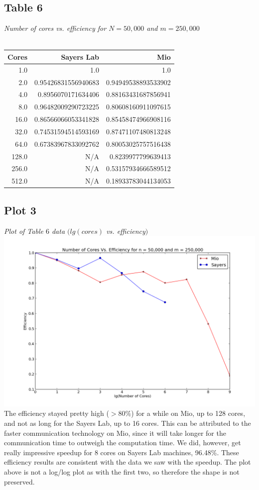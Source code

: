 \documentclass[letterpaper, 12pt]{article}
\begin{document}
	\subsection*{Table 6} \small\textit{Number of cores vs. efficiency for $N=50,000$ and $m=250,000$} \\\\
	\normalsize
	\begin{tabular}{r||r|r}
	\hline
		Cores              &Sayers Lab                     &Mio \\ 
	\hline
		  1.0                     &1.0                     &1.0 \\ 
		  2.0     &0.95426831556940683     &0.94949538893533902 \\ 
		  4.0      &0.8956070171634406     &0.88163431687856941 \\ 
		  8.0     &0.96482009290723225     &0.80608160911097615 \\ 
		 16.0     &0.86566066053341828     &0.85458474966908116 \\ 
		 32.0     &0.74531594514593169     &0.87471107480813248 \\ 
		 64.0     &0.67383967833092762     &0.80053025757516438 \\ 
		128.0                     &N/A      &0.8239977799639413 \\ 
		256.0                     &N/A     &0.53157934666589512 \\ 
		512.0                     &N/A     &0.18933783044134053 \\ 
		\hline
	\end{tabular}
	
	\subsection*{Plot 3} \small\textit{Plot of Table $6$ data $(lg(cores)$ vs. efficiency$)$} \\
	\normalsize
	\includegraphics[width=.75\linewidth]{ProjectFiles/results/plots/coresVefficiency.png} \\
	The efficiency stayed pretty high ($>80\%$) for a while on Mio, up to 128 cores, and not as long for the Sayers Lab, up to 16 cores. This can be attributed to the faster communication technology on Mio, since it will take longer for the communication time to outweigh the computation time. We did, however, get really impressive speedup for 8 cores on Sayers Lab machines, 96.48\%. These efficiency results are consistent with the data we saw with the speedup. The plot above is not a log/log plot as with the first two, so therefore the shape is not preserved.
	
\end{document}
